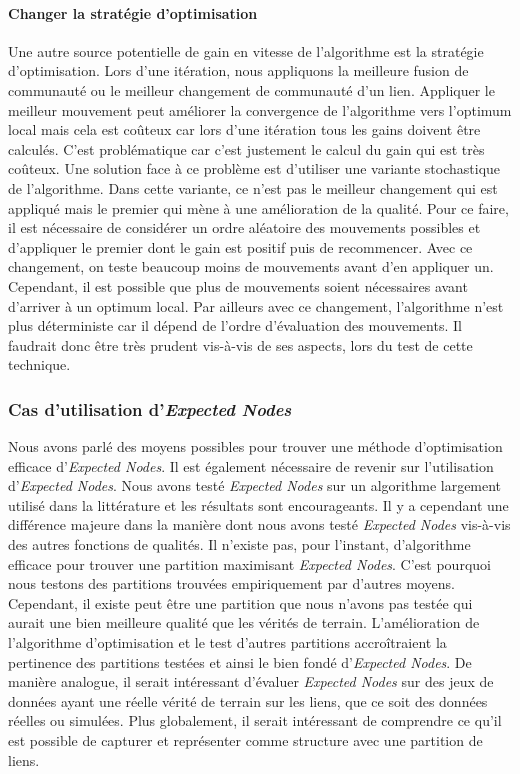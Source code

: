 \paragraph{Changer la stratégie d'optimisation}
Une autre source potentielle de gain en vitesse de l'algorithme est la stratégie d'optimisation.
Lors d'une itération, nous appliquons la meilleure fusion de communauté ou le meilleur changement de communauté d'un lien.
Appliquer le meilleur mouvement peut améliorer la convergence de l'algorithme vers l'optimum local mais cela est coûteux car lors d'une itération tous les gains doivent être calculés.
C'est problématique car c'est justement le calcul du gain qui est très coûteux.
Une solution face à ce problème est d'utiliser une variante stochastique de l'algorithme.
Dans cette variante, ce n'est pas le meilleur changement qui est appliqué mais le premier qui mène à une amélioration de la qualité.
Pour ce faire, il est nécessaire de considérer un ordre aléatoire des mouvements possibles et d'appliquer le premier dont le gain est positif puis de recommencer.
Avec ce changement, on teste beaucoup moins de mouvements avant d'en appliquer un.
Cependant, il est possible que plus de mouvements soient nécessaires avant d'arriver à un optimum local.
Par ailleurs avec ce changement, l'algorithme n'est plus déterministe car il dépend de l'ordre d'évaluation des mouvements.
Il faudrait donc être très prudent vis-à-vis de ses aspects, lors du test de cette technique.

\subsubsection{Cas d'utilisation d'\emph{Expected Nodes}}
Nous avons parlé des moyens possibles pour trouver une méthode d'optimisation efficace d'\emph{Expected Nodes}.
Il est également nécessaire de revenir sur l'utilisation d'\emph{Expected Nodes}.
Nous avons testé \emph{Expected Nodes} sur un algorithme largement utilisé dans la littérature et les résultats sont encourageants.
Il y a cependant une différence majeure dans la manière dont nous avons testé \emph{Expected Nodes} vis-à-vis des autres fonctions de qualités.
Il n'existe pas, pour l'instant, d'algorithme efficace pour trouver une partition maximisant \emph{Expected Nodes}.
C'est pourquoi nous testons des partitions trouvées empiriquement par d'autres moyens.
Cependant, il existe peut être une partition que nous n'avons pas testée qui aurait une bien meilleure qualité que les vérités de terrain.
L'amélioration de l'algorithme d'optimisation et le test d'autres partitions accroîtraient la pertinence des partitions testées et ainsi le bien fondé d'\emph{Expected Nodes}.
De manière analogue, il serait intéressant d'évaluer \emph{Expected Nodes} sur des jeux de données ayant une réelle vérité de terrain sur les liens, que ce soit des données réelles ou simulées.
Plus globalement, il serait intéressant de comprendre ce qu'il est possible de capturer et représenter comme structure avec une partition de liens.

